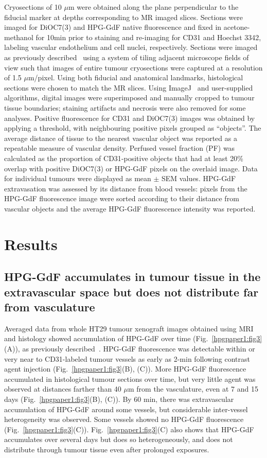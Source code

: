 Cryosections of 10 $\mu$m were obtained along the plane perpendicular to the fiducial marker at depths corresponding to MR imaged slices.
Sections were imaged for DiOC7(3) and \acs{HPG-GdF} native fluorescence and fixed in acetone-methanol for 10min prior to staining and re-imaging for \acs{CD31} and Hoechst 3342, labeling vascular endothelium and cell nuclei, respectively.
Sections were imaged as previously described~\cite{Kyle:2007ch} using a system of tiling adjacent microscope fields of view such that images of entire tumour cryosections were captured at a resolution of 1.5 $\mu$m/pixel.
Using both fiducial and anatomical landmarks, histological sections were chosen to match the MR slices.
Using ImageJ~\cite{Collins:2007jr} and user-supplied algorithms, digital images were superimposed and manually cropped to tumour tissue boundaries; staining artifacts and necrosis were also removed for some analyses.
Positive fluorescence for \acs{CD31} and DiOC7(3) images was obtained by applying a threshold, with neighbouring positive pixels grouped as ``objects''.
The average distance of tissue to the nearest vascular object was reported as a repeatable measure of vascular density.
Perfused vessel fraction (PF) was calculated as the proportion of \acs{CD31}-positive objects that had at least 20\% overlap with positive DiOC7(3) or \acs{HPG-GdF} pixels on the overlaid image.
Data for individual tumours were displayed as mean $\pm$ SEM values.
HPG-GdF extravasation was assessed by its distance from blood vessels: pixels from the \acs{HPG-GdF} fluorescence image were sorted according to their distance from vascular objects and the average \acs{HPG-GdF} fluorescence intensity was reported.

\section{Results}

\subsection{HPG-GdF accumulates in tumour tissue in the extravascular space but does not distribute far from vasculature}

Averaged data from whole HT29 tumour xenograft images obtained using MRI and histology showed accumulation of \acs{HPG-GdF} over time (Fig.~\ref{hpgpaper1:fig3}(A)), as previously described~\cite{Saatchi:2012hc}.
\acs{HPG-GdF} fluorescence was detectable within or very near to \acs{CD31}-labeled tumour vessels as early as 2-min following contrast agent injection (Fig.~\ref{hpgpaper1:fig3}(B), (C)).
More \acs{HPG-GdF} fluorescence accumulated in histological tumour sections over time, but very little agent was observed at distances farther than 40 $\mu$m from the vasculature, even at 7 and 15 days (Fig.~\ref{hpgpaper1:fig3}(B), (C)).
By 60 min, there was extravascular accumulation of \acs{HPG-GdF} around some vessels, but considerable inter-vessel heterogeneity was observed.
Some vessels showed no \acs{HPG-GdF} fluorescence (Fig.~\ref{hpgpaper1:fig3}(C)).
Fig.~\ref{hpgpaper1:fig3}(C) also shows that \acs{HPG-GdF} accumulates over several days but does so heterogeneously, and does not distribute through tumour tissue even after prolonged exposures.

